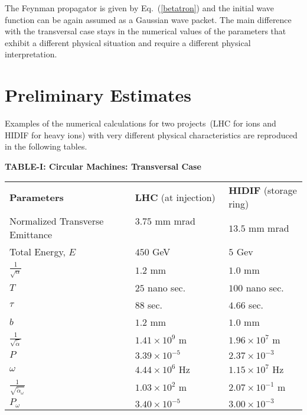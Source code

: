 \documentclass[]{article}
\begin{document}
The Feynman propagator is given by Eq.~(\ref{betatron}) and the initial
wave function can be again assumed as a Gaussian wave packet. The main
difference with the transversal case stays in the numerical values of
the parameters that exhibit a different physical situation and require
a different physical interpretation.


\section{Preliminary Estimates}
Examples of the numerical calculations for two projects~(LHC for ions 
and HIDIF for heavy ions) with very different physical characteristics are 
reproduced in the following tables.

\begin{center}

{\bf TABLE-I: Circular Machines: Transversal Case}
\medskip

\begin{tabular}{lll}
{\bf Parameters} & {\bf LHC} (at injection) & {\bf HIDIF} (storage ring) \\
Normalized Transverse Emittance ~~~~~~~
& $3.75$ mm mrad ~~~~~~~~~~~ & $13.5$ mm mrad \\
Total Energy, $E$ & $450$ GeV & $5$ Gev \\
$\frac{1}{\sqrt{\alpha}}$ & $1.2$ mm & $1.0$ mm \\
$T$ & $25$ nano sec. & $100$ nano sec. \\
$\tau$ & $88$ sec. & $4.66$ sec. \\
$b$ & $1.2$ mm & $1.0$ mm \\
$\frac{1}{\sqrt{\tilde{\alpha}}}$ & $1.41 \times 10^{9}$ m & 
$1.96 \times 10^{7}$ m \\
$P$ & $3.39 \times 10^{-5}$ & $2.37 \times 10^{-3}$ \\
$\omega$ & $4.44 \times 10^{6}$ Hz & $1.15 \times 10^{7}$ Hz \\
$\frac{1}{\sqrt{{\tilde{\alpha}_\omega}}}$ & $1.03 \times 10^{2}$ m
& $2.07 \times 10^{-1}$ m \\
$P_{\omega}$ & $3.40 \times 10^{-5}$ & $3.00 \times 10^{-3}$ \\
\end{tabular}

\end{center}

\bigskip
\end{document}
